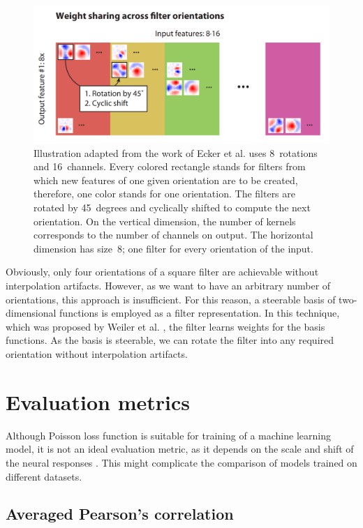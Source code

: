 \begin{figure}[h]\centering
	\includegraphics[width=140mm]{../img/reCNN_visualization.png}
	\caption{Illustration adapted from the work of Ecker et al. \citep{ecker2018rotation} uses 8~rotations and 16~channels. Every colored rectangle stands for filters from which new features of one given orientation are to be created, therefore, one color stands for one orientation. The filters are rotated by 45~degrees and cyclically shifted to compute the next orientation. On the vertical dimension, the number of kernels corresponds to the number of channels on output. The horizontal dimension has size~8; one filter for every orientation of the input.}
	\label{img04:recnn}
\end{figure}


Obviously, only four orientations of a square filter are achievable without interpolation artifacts. However, as we want to have an arbitrary number of orientations, this approach is insufficient. For this reason, a steerable basis of two-dimensional functions is employed as a filter representation. In this technique, which was proposed by Weiler et al. \citep{weiler2018learning}, the filter learns weights for the basis functions. As the basis is steerable, we can rotate the filter into any required orientation without interpolation artifacts.

\section{Evaluation metrics}

Although Poisson loss function is suitable for training of a machine learning model, it is not an ideal evaluation metric, as it depends on the scale and shift of the neural responses \citep{willeke2022sensorium}. This might complicate the comparison of models trained on different datasets.

\subsection{Averaged Pearson’s correlation}


